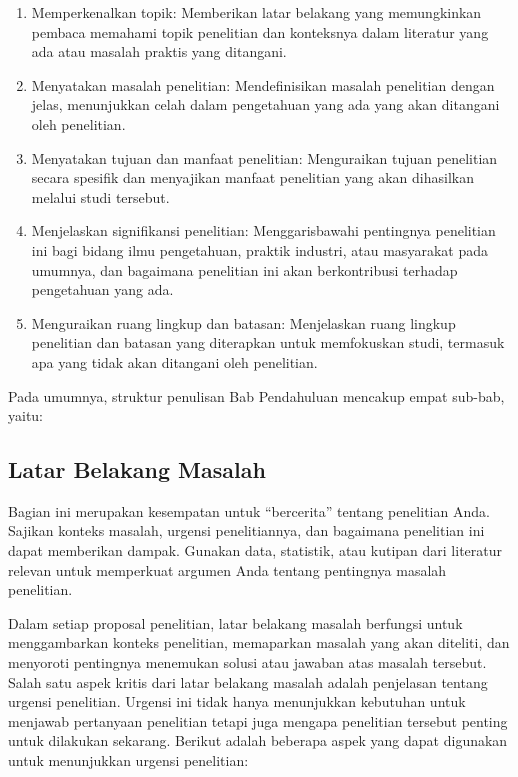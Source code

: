 \documentclass[
  indonesian,
  letterpaper,
]{scrbook}
\providecommand{\tightlist}{%
  \setlength{\itemsep}{0pt}\setlength{\parskip}{0pt}}
\begin{document}
\begin{enumerate}
\def\labelenumi{\arabic{enumi}.}
\tightlist
\item
  Memperkenalkan topik: Memberikan latar belakang yang memungkinkan
  pembaca memahami topik penelitian dan konteksnya dalam literatur yang
  ada atau masalah praktis yang ditangani.
\item
  Menyatakan masalah penelitian: Mendefinisikan masalah penelitian
  dengan jelas, menunjukkan celah dalam pengetahuan yang ada yang akan
  ditangani oleh penelitian.
\item
  Menyatakan tujuan dan manfaat penelitian: Menguraikan tujuan
  penelitian secara spesifik dan menyajikan manfaat penelitian yang akan
  dihasilkan melalui studi tersebut.
\item
  Menjelaskan signifikansi penelitian: Menggarisbawahi pentingnya
  penelitian ini bagi bidang ilmu pengetahuan, praktik industri, atau
  masyarakat pada umumnya, dan bagaimana penelitian ini akan
  berkontribusi terhadap pengetahuan yang ada.
\item
  Menguraikan ruang lingkup dan batasan: Menjelaskan ruang lingkup
  penelitian dan batasan yang diterapkan untuk memfokuskan studi,
  termasuk apa yang tidak akan ditangani oleh penelitian.
\end{enumerate}

Pada umumnya, struktur penulisan Bab Pendahuluan mencakup empat sub-bab,
yaitu:

\subsection*{Latar Belakang Masalah}\label{latar-belakang-masalah}

Bagian ini merupakan kesempatan untuk ``bercerita'' tentang penelitian
Anda. Sajikan konteks masalah, urgensi penelitiannya, dan bagaimana
penelitian ini dapat memberikan dampak. Gunakan data, statistik, atau
kutipan dari literatur relevan untuk memperkuat argumen Anda tentang
pentingnya masalah penelitian.

Dalam setiap proposal penelitian, latar belakang masalah berfungsi untuk
menggambarkan konteks penelitian, memaparkan masalah yang akan diteliti,
dan menyoroti pentingnya menemukan solusi atau jawaban atas masalah
tersebut. Salah satu aspek kritis dari latar belakang masalah adalah
penjelasan tentang urgensi penelitian. Urgensi ini tidak hanya
menunjukkan kebutuhan untuk menjawab pertanyaan penelitian tetapi juga
mengapa penelitian tersebut penting untuk dilakukan sekarang. Berikut
adalah beberapa aspek yang dapat digunakan untuk menunjukkan urgensi
penelitian:
\end{document}
